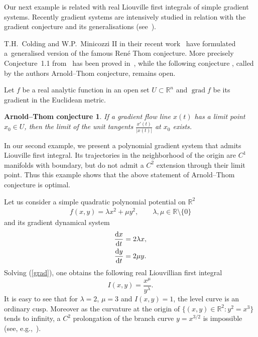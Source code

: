 \documentclass[pdftex]{sigma}%
\numberwithin{equation}{section}
\newtheorem*{t*}{Arnold--Thom conjecture}
\newcommand{\R}{\mathbb{R}}
\def \grad{\operatorname{grad}}
\begin{document}
Our next example is related with real Liouville first integrals of simple gradient systems. Recently gradient systems are intensively studied in relation with the gradient conjecture and its generalisations (see~\cite{ARTH,CM}).

\begin{Example}\label{E}
T.H.~Colding and W.P.~Minicozzi II in their recent work~\cite{ARTH} have formulated a~generalised version of the famous Ren\'e Thom conjecture. More precisely Conjecture~1.1 from~\cite{ARTH} has been proved in~\cite{KK}, while the following conjecture \cite[Conjecture~1.2]{ARTH},
 called by the authors Arnold--Thom conjecture, remains open.

Let $f$ be a real analytic function in an open set $U \subset \R^n$ and $\grad f$ be its gradient in the Euclidean metric.

\begin{t*}
If a gradient flow line $x(t)$ has a limit point $x_0 \in U$, then the limit of the unit tangents $\frac{x'(t)}{|x(t)|}$ at $x_0$ exists.
\end{t*}

 In our second example, we present a polynomial gradient system that admits Liouville first integral. Its trajectories in the neighborhood of the origin are $C^1$ manifolds with boundary, but do not admit a $C^2$ extension through their limit point. Thus this example shows that the above statement of Arnold--Thom conjecture is optimal.

Let us consider a simple quadratic polynomial potential on $\mathbb{R}^2$
\begin{gather*}
f(x,y)=\lambda x^2+\mu y^2, \qquad \lambda,\mu \in \mathbb{R}\setminus \{0\}
\end{gather*}
and its gradient dynamical system
\begin{gather}
\frac{{\rm d}x}{{\rm d}t} = 2 \lambda x, \nonumber
\\
\frac{{\rm d}y}{{\rm d}t} = 2 \mu y.\label{grad}
\end{gather}
Solving (\ref{grad}), one obtains the following real Liouvillian first integral
\[
I(x,y)=\dfrac{x^{\mu}}{y^{\lambda}}.
\]
It is easy to see that for $\lambda=2$, $\mu=3$ and $I(x,y)=1$, the level curve is an ordinary cusp. Moreover as the curvature at the origin of $\big\{(x,y) \in \mathbb{R}^2 \colon y^2=x^3 \big\}$ tends to infinity, a $C^2$ prolongation of the branch curve $y=x^{3/2}$ is impossible (see, e.g.,~\cite[Theorem~5.1.6]{DFN}).
\end{Example}
\end{document}
